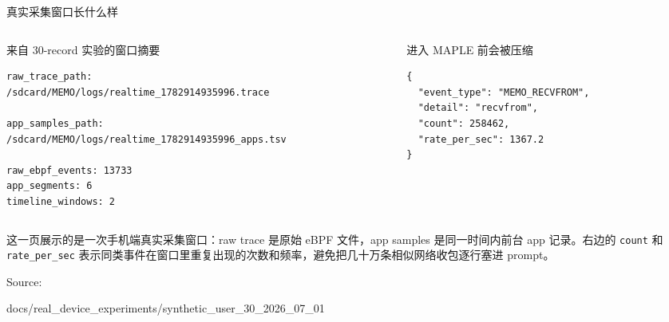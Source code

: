 \documentclass[UTF8,aspectratio=169,10pt]{ctexbeamer}
\newcommand{\code}[1]{\texttt{\small #1}}
\newcommand{\sourcefoot}[1]{%
  \vfill
  {\scriptsize\textcolor{memoGray}{Source: }%
  \parbox[t]{0.84\textwidth}{\raggedright\ttfamily\scriptsize #1}}%
}
\newcommand{\explainfoot}[1]{%
  \vspace{0.35em}
  {\scriptsize\color{memoGray}#1}
}
\begin{document}
\begin{frame}[fragile]{真实采集窗口长什么样}
  \begin{columns}[T,totalwidth=\textwidth]
    \begin{column}{0.50\textwidth}
      \begin{block}{来自 30-record 实验的窗口摘要}
\begin{lstlisting}
raw_trace_path:
/sdcard/MEMO/logs/realtime_1782914935996.trace

app_samples_path:
/sdcard/MEMO/logs/realtime_1782914935996_apps.tsv

raw_ebpf_events: 13733
app_segments: 6
timeline_windows: 2
\end{lstlisting}
      \end{block}
    \end{column}
    \begin{column}{0.46\textwidth}
      \begin{block}{进入 MAPLE 前会被压缩}
\begin{lstlisting}
{
  "event_type": "MEMO_RECVFROM",
  "detail": "recvfrom",
  "count": 258462,
  "rate_per_sec": 1367.2
}
\end{lstlisting}
      \end{block}
    \end{column}
  \end{columns}
  \explainfoot{这一页展示的是一次手机端真实采集窗口：raw trace 是原始 eBPF 文件，app samples 是同一时间内前台 app 记录。右边的 \code{count} 和 \code{rate\_per\_sec} 表示同类事件在窗口里重复出现的次数和频率，避免把几十万条相似网络收包逐行塞进 prompt。}
  \sourcefoot{docs/real\_device\_experiments/synthetic\_user\_30\_2026\_07\_01}
\end{frame}
\end{document}
